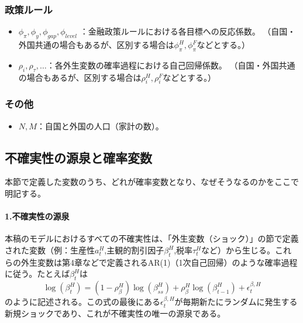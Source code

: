 \subsubsection*{政策ルール}
\label{sec:chapter3_definitions_variables_parameters_policy}
\begin{itemize}
    \item
    \label{itm:chapter3_definitions_variables_parameters_policy_phi}
        \(\phi_\pi,\phi_y,\phi_{gap},\phi_{level}\)
        ：金融政策ルールにおける各目標への反応係数。
        （自国・外国共通の場合もあるが、区別する場合は\(\phi_\pi^H,\phi_\pi^F\)などとする。）
    \item
    \label{itm:chapter3_definitions_variables_parameters_policy_rho}
        \(\rho_i,\rho_\tau,\dots\)：各外生変数の確率過程における自己回帰係数。
        （自国・外国共通の場合もあるが、区別する場合は\(\rho_i^H,\rho_i^F\)などとする。）
\end{itemize}

\subsubsection*{その他}
\label{sec:chapter3_definitions_variables_parameters_others}
\begin{itemize}
    \item
    \label{itm:chapter3_definitions_variables_parameters_others_pop}
        \(N,M\)：自国と外国の人口（家計の数）。
\end{itemize}

\subsection*{不確実性の源泉と確率変数}
\label{sec:chapter3_definitions_variables_stochastic_nature}
本節で定義した変数のうち、どれが確率変数となり、なぜそうなるのかをここで明記する。

\paragraph{1.不確実性の源泉}
\label{sec:chapter3_definitions_variables_stochastic_nature_sources}
本稿のモデルにおけるすべての不確実性は、「外生変数（ショック）」の節で定義された変数（例：生産性\(a_t^H\),主観的割引因子\(\beta_t^H\),税率\(\tau_t^H\)など）から生じる。これらの外生変数は第4章などで定義されるAR(1)（1次自己回帰）のような確率過程に従う。たとえば\(\beta_t^H\)は
\begin{equation}
\label{form:chapter3_definitions_variables_stochastic_nature_sources_beta_def}
    \log(\beta_t^H)=(1-\rho_\beta^H)\log(\beta_{ss}^H)+\rho_\beta^H\log(\beta_{t-1}^H)+\epsilon_t^{\beta,H}
\end{equation}
のように記述される。この式の最後にある\(\epsilon_t^{\beta,H}\)が毎期新たにランダムに発生する新規ショックであり、これが不確実性の唯一の源泉である。

